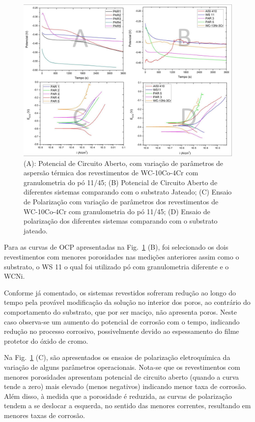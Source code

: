 \begin{figure}
	\centering
	\includegraphics[width=1\columnwidth]{method/figs/adequacao/adequacao4.png}
    \caption{(A): Potencial de Circuito Aberto, com variação de parâmetros de
    aspersão térmica dos revestimentos de WC-10Co-4Cr com granulometria do pó
    11/45; (B) Potencial de Circuito Aberto de diferentes sistemas comparando
    com o substrato Jateado; (C) Ensaio de Polarização com variação de
    parâmetros dos revestimentos de WC-10Co-4Cr com granulometria do pó 11/45;
    (D) Ensaio de polarização dos diferentes sistemas comparando com o
    substrato jateado.}
    \label{fig:adequacao4}
\end{figure}

Para as curvas de OCP apresentadas na Fig.~\ref{fig:adequacao4} (B), foi
selecionado os dois revestimentos com menores porosidades nas medições
anteriores assim como o substrato, o WS 11 o qual foi utilizado pó com
granulometria diferente e o WCNi.

Conforme já comentado, os sistemas revestidos sofreram redução ao longo do tempo
pela provável modificação da solução no interior dos poros, ao contrário do
comportamento do substrato, que por ser maciço, não apresenta poros. Neste caso
observa-se um aumento do potencial de corrosão com o tempo, indicando redução no
processo corrosivo, possivelmente devido ao espessamento do filme protetor do
óxido de cromo.

Na Fig.~\ref{fig:adequacao4} (C), são apresentados os ensaios de polarização
eletroquímica da variação de alguns parâmetros operacionais. Nota-se que os
revestimentos com menores porosidades apresentam potencial de circuito aberto
(quando a curva tende a zero) mais elevado (menos negativos) indicando menor
taxa de corrosão. Além disso, à medida que a porosidade é reduzida, as curvas de
polarização tendem a se deslocar a esquerda, no sentido das menores correntes,
resultando em menores taxas de corrosão.

